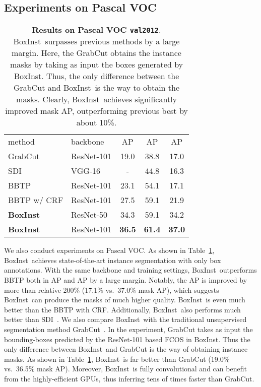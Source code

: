 \documentclass[final]{cvpr}
\newcommand{\1}{{\mathbbm{1}}}
\def\Ours{{BoxInst}\xspace}
\begin{document}
{\subsection{Experiments on Pascal VOC}
\begin{table}
\centering
\small
\begin{tabular}{ l|l|c|c c}
method & backbone & AP & AP & AP \\
\Xhline{2\arrayrulewidth}
GrabCut~\cite{rother2004grabcut} & ResNet-101 & 19.0 & 38.8 & 17.0 \\
SDI~\cite{khoreva2017simple} & VGG-16 & - & 44.8 & 16.3 \\
BBTP~\cite{hsu2019weakly} & ResNet-101 & 23.1 & 54.1 & 17.1 \\
BBTP w/ CRF & ResNet-101 & 27.5 & 59.1 & 21.9 \\
\hline
\textbf{\Ours} & ResNet-50 & 34.3 & 59.1 & 34.2 \\
\textbf{\Ours} & ResNet-101 & \textbf{36.5} & \textbf{61.4} & \textbf{37.0} \\
\end{tabular}
\caption{
\textbf{Results on Pascal VOC \texttt{val2012}}. \Ours\ surpasses previous methods by a large margin. Here, the GrabCut obtains the instance masks by taking as input the boxes generated by \Ours. Thus, the only difference between the GrabCut and \Ours\ is the way to obtain the masks.
Clearly,
\Ours\ achieves
significantly
improved mask AP, outperforming previous best by about 10\%.
}
\label{table:experiments_on_voc}

\end{table}
We also conduct experiments on Pascal VOC. As shown in Table~\ref{table:experiments_on_voc}, \Ours\ achieves state-of-the-art instance segmentation with only box annotations. With the same backbone and training settings, \Ours\ outperforms BBTP both in AP and AP by a large margin. Notably, the AP is improved by more than relative 200\% (17.1\% vs.\ 37.0\% mask AP), which suggests \Ours\ can produce the masks of much higher quality. \Ours\ is even much better than the BBTP with CRF. Additionally, \Ours\ also performs much better than SDI~\cite{khoreva2017simple}. We also compare \Ours\ with the traditional unsupervised segmentation method GrabCut~\cite{rother2004grabcut}. In the experiment, GrabCut takes as input the bounding-boxes predicted by the ResNet-101 based FCOS in \Ours. Thus the only difference between \Ours\ and GrabCut is the way of obtaining instance masks. As shown in Table~\ref{table:experiments_on_voc}, \Ours\ is far better than GrabCut (19.0\% vs.\ 36.5\% mask AP). Moreover, \Ours\ is fully convolutional and can benefit from the highly-efficient GPUs, thus inferring tens of times faster than GrabCut.

}
\end{document}
